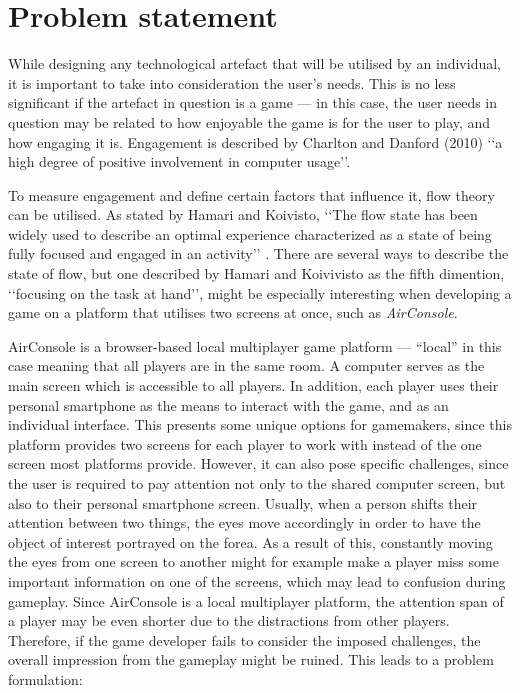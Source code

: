 \chapter{Problem statement}\label{ch:problem}
While designing any technological artefact that will be utilised by an individual, it is important to take into consideration the user's needs. This is no less significant if the artefact in question is a game --- in this case, the user needs in question may be related to how enjoyable the game is for the user to play, and how engaging it is. Engagement is described by Charlton and Danford (2010) \cite{Charlton2010} ‘‘a high degree of positive involvement in computer usage’’. 

To measure engagement and define certain factors that influence it, flow theory can be utilised. As stated by Hamari and Koivisto, ‘‘The flow state has been widely used to describe an optimal experience characterized as a state of being fully focused and engaged in an activity’’ \cite{Hamari2014}. There are several ways to describe the state of flow, but one described by Hamari and Koivivisto as the fifth dimention, ‘‘focusing on the task at hand’’, might be especially interesting when developing a game on a platform that utilises two screens at once, such as \textit{AirConsole}.

AirConsole is a browser-based local multiplayer game platform --- “local” in this case meaning that all players are in the same room. A computer serves as the main screen which is accessible to all players. In addition, each player uses their personal smartphone as the means to interact with the game, and as an individual interface. This presents some unique options for gamemakers, since this platform provides two screens for each player to work with instead of the one screen most platforms provide. However, it can also pose specific challenges, since the user is required to pay attention not only to the shared computer screen, but also to their personal smartphone screen. Usually, when a person shifts their attention between two things, the eyes move accordingly in order to have the object of interest portrayed on the forea. As a result of this, constantly moving the eyes from one screen to another might for example make a player miss some important information on one of the screens, which may lead to confusion during gameplay. Since AirConsole is a local multiplayer platform, the attention span of a player may be even shorter due to the distractions from other players. Therefore, if the game developer fails to consider the imposed challenges, the overall impression from the gameplay might be ruined. This leads to a problem formulation:

